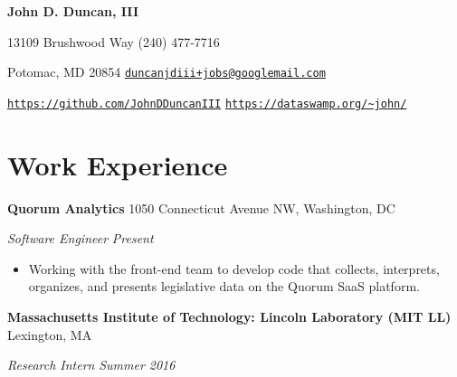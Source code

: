 \documentclass[11pt]{article}
\begin{document}
\fancyfoot{}
\pagestyle{fancy}
\thispagestyle{empty}
\renewcommand{\headrulewidth}{0pt}
\renewcommand{\footrulewidth}{0pt}

\begin{center}
	{\huge \textbf{John D. Duncan, III}}
\end{center}
13109 Brushwood Way
\hfill
(240) 477-7716

Potomac, MD 20854
\hfill
\texttt{\href{mailto:duncanjdiii+jobs@googlemail.com}{duncanjdiii+jobs@googlemail.com}}

\texttt{\url{https://github.com/JohnDDuncanIII}}
\hfill
\texttt{\url{https://dataswamp.org/~john/}}

\section*{Work Experience}
\textbf{Quorum Analytics}
\hfill
1050 Connecticut Avenue NW, Washington, DC

\textit{Software Engineer}
\hfill
\textit{Present}

\begin{itemize}
	\item Working with the front-end team to develop code that collects, interprets, organizes, and 
presents legislative data on the Quorum SaaS platform.
\end{itemize}


\textbf{Massachusetts Institute of Technology: Lincoln Laboratory (MIT LL)}
\hfill
Lexington, MA 

\textit{Research Intern}
\hfill
\textit{Summer 2016}
\end{document}
